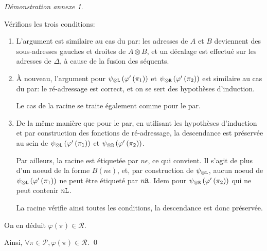 \documentclass[11pt,a4paper]{article}
\theoremstyle{plain}
\theoremstyle{definition}
\theoremstyle{remark}
\newtheorem{demonstrationappendix}{Démonstration annexe}
\newcommand*{\tensor}{\otimes}
\newcommand*{\someproof}{\pi}
\newcommand*{\sequentbis}{\Delta}
\newcommand*{\Left}{\textnormal{\texttt{L}}}
\newcommand*{\Right}{\textnormal{\texttt{R}}}
\newcommand*{\proofs}{\ensuremath{\mathcal{P}}}
\newcommand*{\representations}{\ensuremath{\mathcal{R}}}
\newcommand*{\encode}{\ensuremath{\varphi}}
\begin{document}
\begin{demonstrationappendix}
\begin{description}
    Vérifions les trois conditions:
    \begin{enumerate}
        \item L'argument est similaire au cas du par: les adresses de $A$ et $B$ deviennent des sous-adresses gauches et droites de $A \tensor B$, et un décalage est effectué sur les adresses de $\sequentbis$, à cause de la fusion des séquents.

        \item À nouveau, l'argument pour $\psi_{\tensor\Left} \left( \encode' \left( \pi_1 \right) \right)$ et $\psi_{\tensor\Right} \left( \encode' \left( \pi_2 \right) \right)$ est similaire au cas du par: le ré-adressage est correct, et on se sert des hypothèses d'induction.
        
        Le cas de la racine se traite également comme pour le par.

        \item De la même manière que pour le par, en utilisant les hypothèses d'induction et par construction des fonctions de ré-adressage, la descendance est préservée au sein de $\psi_{\tensor\Left} \left( \encode' \left( \pi_1 \right) \right)$ et $\psi_{\tensor\Right} \left( \encode' \left( \pi_2 \right) \right)$.

        Par ailleurs, la racine est étiquetée par $n \epsilon$, ce qui convient. Il s'agit de plus d'un noeud de la forme $B(n \epsilon)$, et, par construction de $\psi_{\tensor\Left}$, aucun noeud de $\psi_{\tensor\Left} \left( \encode' \left( \pi_1 \right) \right)$ ne peut être étiqueté par $n \Right$. Idem pour $\psi_{\tensor\Right} \left( \encode' \left( \pi_2 \right) \right)$ qui ne peut contenir $n \Left$.

        La racine vérifie ainsi toutes les conditions, la descendance est donc préservée.
    \end{enumerate}

    On en déduit $\encode \left( \someproof \right) \in \representations$.
    \end{description}

    Ainsi, $\forall \someproof \in \proofs, \encode \left( \someproof \right) \in \representations$.
    \qed{}
\end{demonstrationappendix}
\end{document}
